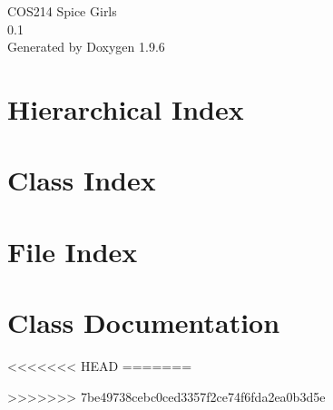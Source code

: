 \documentclass[twoside]{book}
\newcommand{\+}{\discretionary{\mbox{\scriptsize$\hookleftarrow$}}{}{}}
\newcommand{\clearemptydoublepage}{%
    \newpage{\pagestyle{empty}\cleardoublepage}%
  }
\begin{document}
  \raggedbottom
    \hypersetup{pageanchor=false,
                bookmarksnumbered=true,
                pdfencoding=unicode
               }
  \begin{titlepage}
  \vspace*{7cm}
  \begin{center}%
  {\Large COS214 Spice Girls}\\
  [1ex]\large 0.\+1 \\
  \vspace*{1cm}
  {\large Generated by Doxygen 1.9.6}\\
  \end{center}
  \end{titlepage}
  \clearemptydoublepage
  \tableofcontents
  \clearemptydoublepage
  \hypersetup{pageanchor=true}
\chapter{Hierarchical Index}

\chapter{Class Index}

\chapter{File Index}

\chapter{Class Documentation}





<<<<<<< HEAD
=======


>>>>>>> 7be49738cebc0ced3357f2ce74f6fda2ea0b3d5e




















\end{document}
